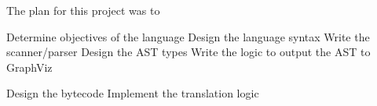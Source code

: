 The plan for this project was to 

Determine objectives of the language
Design the language syntax
	Write the scanner/parser
	Design the AST types
Write the logic to output the AST to GraphViz

Design the bytecode
Implement the translation logic
